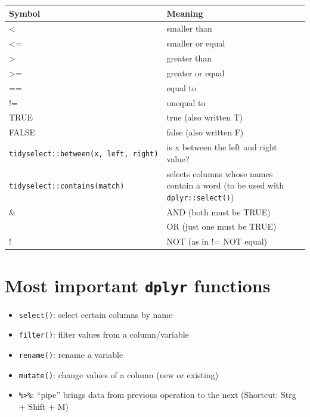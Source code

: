 \documentclass[
]{book}
\providecommand{\tightlist}{%
  \setlength{\itemsep}{0pt}\setlength{\parskip}{0pt}}
\begin{document}
\begin{longtable}[]{@{}
  >{\raggedright\arraybackslash}p{}
  >{\raggedright\arraybackslash}p{}@{}}
\toprule\noalign{}
\begin{minipage}[b]{\linewidth}\raggedright
Symbol
\end{minipage} & \begin{minipage}[b]{\linewidth}\raggedright
Meaning
\end{minipage} \\
\midrule\noalign{}
\endhead
\bottomrule\noalign{}
\endlastfoot
\textless{} & smaller than \\
\textless= & smaller or equal \\
\textgreater{} & greater than \\
\textgreater= & greater or equal \\
== & equal to \\
!= & unequal to \\
TRUE & true (also written T) \\
FALSE & false (also written F) \\
\texttt{tidyselect::between(x,\ left,\ right)} & is x between the left and right value? \\
\texttt{tidyselect::contains(match)} & selects columns whose names contain a word (to be used with \texttt{dplyr::select()}) \\
\& & AND (both must be TRUE) \\
\textbar{} & OR (just one must be TRUE) \\
! & NOT (as in != NOT equal) \\
\end{longtable}

\section*{\texorpdfstring{Most important \texttt{dplyr} functions}{Most important dplyr functions}}\label{mif}

\begin{itemize}
\tightlist
\item
  \texttt{select()}: select certain columns by name
\item
  \texttt{filter()}: filter values from a column/variable
\item
  \texttt{rename()}: rename a variable
\item
  \texttt{mutate()}: change values of a column (new or existing)
\item
  \texttt{\%\textgreater{}\%}: ``pipe'' brings data from previous operation to the next (Shortcut: Strg + Shift + M)
\end{itemize}
\end{document}
